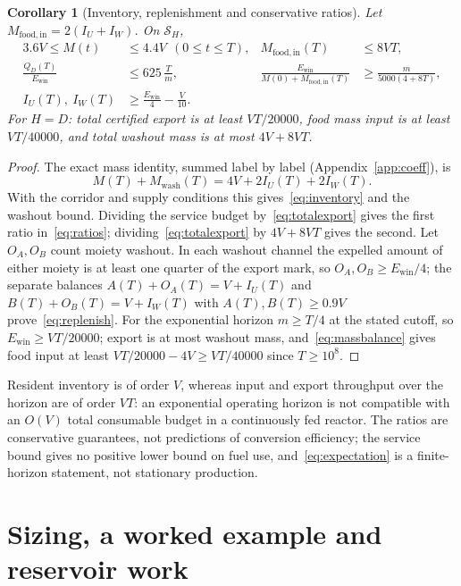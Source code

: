 \documentclass[11pt,a4paper]{article}
\theoremstyle{plain}
\newtheorem{corollary}[theorem]{Corollary}
\theoremstyle{definition}
\theoremstyle{remark}
\newcommand{\Son}{\mathcal S}
\newcommand{\Ewin}{E_{\mathrm{win}}}
\begin{document}
\begin{corollary}[Inventory, replenishment and conservative ratios]\label{cor:cost}
Let $M_{\mathrm{food,in}}=2(I_U+I_W)$. On $\Son_H$,
\begin{align}
 3.6V\le M(t)&\le4.4V\ \ (0\le t\le T),&M_{\mathrm{food,in}}(T)&\le8VT,\label{eq:inventory}\\
 \frac{Q_D(T)}{\Ewin}&\le625\,\frac Tm,&\frac{\Ewin}{M(0)+M_{\mathrm{food,in}}(T)}&\ge\frac m{5000(4+8T)},\label{eq:ratios}\\
 I_U(T),\ I_W(T)&\ge\frac{\Ewin}4-\frac V{10}.\label{eq:replenish}
\end{align}
For $H=D$: total certified export is at least $VT/20000$, food mass input is at least $VT/40000$, and total washout mass is at most $4V+8VT$.
\end{corollary}
\begin{proof}
The exact mass identity, summed label by label (Appendix~\ref{app:coeff}), is
\begin{equation}\label{eq:massbalance}
 M(T)+M_{\mathrm{wash}}(T)=4V+2I_U(T)+2I_W(T).
\end{equation}
With the corridor and supply conditions this gives~\eqref{eq:inventory} and the washout bound. Dividing the service budget by~\eqref{eq:totalexport} gives the first ratio in~\eqref{eq:ratios}; dividing~\eqref{eq:totalexport} by $4V+8VT$ gives the second. Let $O_A,O_B$ count moiety washout. In each washout channel the expelled amount of either moiety is at least one quarter of the export mark, so $O_A,O_B\ge\Ewin/4$; the separate balances $A(T)+O_A(T)=V+I_U(T)$ and $B(T)+O_B(T)=V+I_W(T)$ with $A(T),B(T)\ge0.9V$ prove~\eqref{eq:replenish}. For the exponential horizon $m\ge T/4$ at the stated cutoff, so $\Ewin\ge VT/20000$; export is at most washout mass, and~\eqref{eq:massbalance} gives food input at least $VT/20000-4V\ge VT/40000$ since $T\ge10^8$.
\end{proof}

Resident inventory is of order $V$, whereas input and export throughput over the horizon are of order $VT$: an exponential operating horizon is not compatible with an $O(V)$ total consumable budget in a continuously fed reactor. The ratios are conservative guarantees, not predictions of conversion efficiency; the service bound gives no positive lower bound on fuel use, and~\eqref{eq:expectation} is a finite-horizon statement, not stationary production.

\section{Sizing, a worked example and reservoir work}\label{sec:example}
\end{document}

